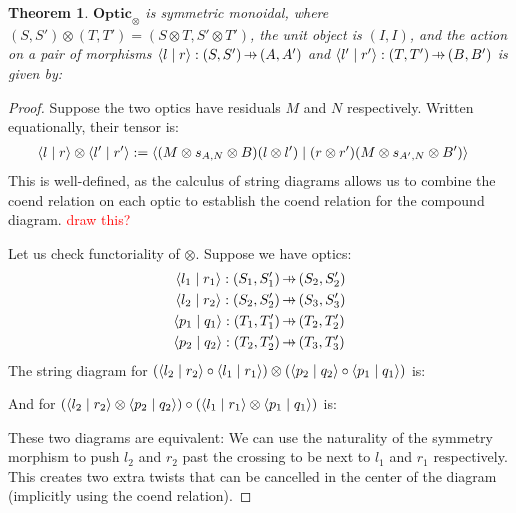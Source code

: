 \documentclass[11pt,letterpaper]{article}
\theoremstyle{plain}
\newtheorem{theorem}{Theorem}[subsection]
\theoremstyle{definition}
\newcommand{\Optic}{\mathbf{Optic}}
\newcommand{\rep}[2]{{\ensuremath \left\langle #1 \mid #2 \right\rangle}}
\newcommand{\hto}{\ensuremath{\,\mathaccent\shortmid\rightarrow\,}}
\newcommand{\todo}[1]{\textcolor{red}{\small #1}}
\begin{document}
\begin{theorem}
  $\Optic_\otimes$ is symmetric monoidal, where $(S, S') \otimes (T, T') = (S \otimes T, S' \otimes T')$, the unit object is $(I, I)$, and the action on a pair of morphisms $\rep{l}{r} : (S, S') \hto (A, A')$ and $\rep{l'}{r'} : (T, T') \hto (B, B')$ is given by:
  \begin{center}
    
  \end{center}
\end{theorem}
\begin{proof}
  Suppose the two optics have residuals $M$ and $N$ respectively. Written equationally, their tensor is:
  \begin{align*}
    \rep{l}{r} \otimes \rep{l'}{r'} &:= \rep{(M \otimes s_{A,N} \otimes B)(l \otimes l')}{(r \otimes r')(M \otimes s_{A',N} \otimes B')}
  \end{align*}
  This is well-defined, as the calculus of string diagrams allows us to combine the coend relation on each optic to establish the coend relation for the compound diagram. \todo{draw this?}

  Let us check functoriality of $\otimes$. Suppose we have optics:
  \begin{align*}
    \rep{l_1}{r_1} : (S_1, S_1') &\hto (S_2, S_2') \\
    \rep{l_2}{r_2} : (S_2, S_2') &\hto (S_3, S_3') \\
    \rep{p_1}{q_1} : (T_1, T_1') &\hto (T_2, T_2') \\
    \rep{p_2}{q_2} : (T_2, T_2') &\hto (T_3, T_3')
  \end{align*}
  The string diagram for $(\rep{l_2}{r_2} \circ \rep{l_1}{r_1}) \otimes (\rep{p_2}{q_2} \circ \rep{p_1}{q_1})$ is:
  \begin{center}
    
  \end{center}
  And for $(\rep{l_2}{r_2} \otimes \rep{p_2}{q_2}) \circ (\rep{l_1}{r_1} \otimes \rep{p_1}{q_1})$ is:
  \begin{center}
    
  \end{center}
  These two diagrams are equivalent: We can use the naturality of the symmetry morphism to push $l_2$ and $r_2$ past the crossing to be next to $l_1$ and $r_1$ respectively. This creates two extra twists that can be cancelled in the center of the diagram (implicitly using the coend relation).


\end{proof}
\end{document}
